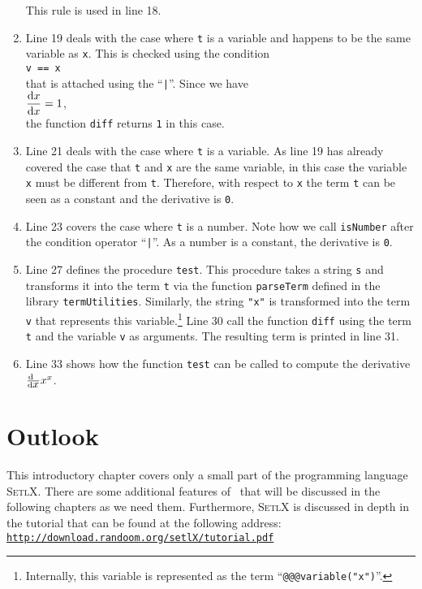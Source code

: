 \begin{enumerate}
      This rule is used in line 18.
\item Line 19 deals with the case where \texttt{t} is a variable and happens to be the same variable as
      \texttt{x}.  This is checked using the condition
      \\[0.2cm]
      \hspace*{1.3cm}
      \texttt{v == x}
      \\[0.2cm]
      that is attached using the  ``\texttt{|}''.   Since we have
      \\[0.2cm]
      \hspace*{1.3cm}
      $\displaystyle \frac{\mathrm{d}x}{\mathrm{d}x} = 1$,
      \\[0.2cm]
      the function \texttt{diff} returns \texttt{1} in this case.
\item Line 21 deals with the case where \texttt{t} is a variable.  As line 19 has already covered the case that
      \texttt{t} and \texttt{x} are the same variable, in this case the variable \texttt{x} must be different
      from \texttt{t}.  Therefore, with respect to \texttt{x} the term \texttt{t} can be seen as a constant and
      the derivative is \texttt{0}.
\item Line 23 covers the case where \texttt{t} is a number.  Note how we call \texttt{isNumber}
      after the condition operator ``\texttt{|}''.  As a number is a constant, the derivative is \texttt{0}.
\item Line 27 defines the procedure \texttt{test}.  This procedure takes a string \texttt{s} and transforms it
      into the term \texttt{t} via the function \texttt{parseTerm} defined in the library
      \texttt{termUtilities}.  Similarly, the string \texttt{"x"} is transformed into the term \texttt{v} that
      represents this variable.\footnote{Internally, this variable is represented as the term
      ``\texttt{@@@variable("x")}''.}
      Line 30 call the function \texttt{diff} using the term \texttt{t} and the variable \texttt{v}
      as arguments.  The resulting term is printed in line 31.
\item Line 33 shows how the function \texttt{test} can be called to compute the derivative $\frac{\textrm{d}\;\;}{\textrm{d}\mbox{$x$}} x^x$.
\end{enumerate}
\pagebreak

\section{Outlook}
This introductory chapter covers only a small part of the programming language  \textsc{SetlX}.  There are some
additional features of \setlx\ that will be discussed in the following chapters as we need them.
Furthermore,  \textsc{SetlX} is discussed in depth in the tutorial that can be found at the following address:
\\[0.2cm]
\hspace*{1.3cm}
\href{http://download.randoom.org/setlX/tutorial.pdf}{\texttt{http://download.randoom.org/setlX/tutorial.pdf}}


